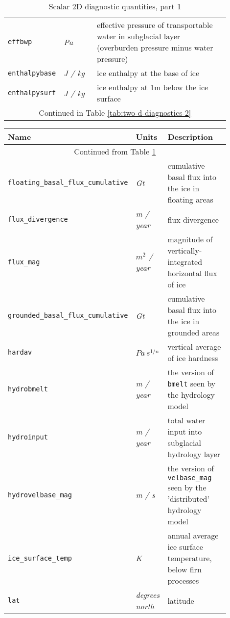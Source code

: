 \begin{table}[ht]
\begin{tabular}{p{0.15\linewidth}p{0.15\linewidth}p{0.6\linewidth}}
    \texttt{effbwp} & \textsl{Pa} & effective pressure of transportable water in subglacial layer (overburden pressure minus water pressure)\\
    \texttt{enthalpybase} & \textsl{J  / kg} &  ice enthalpy at the base of ice \\
    \texttt{enthalpysurf} & \textsl{J  / kg} &  ice enthalpy at 1m below the ice surface \\
   \multicolumn{3}{c}{Continued in Table \ref{tab:two-d-diagnostics-2}}\\
  \bottomrule
  \end{tabular}
  \caption{Scalar 2D diagnostic quantities, part 1}
  \label{tab:two-d-diagnostics-1}
\end{table}

\begin{table}[ht]
  \centering
  \begin{tabular}{p{0.15\linewidth}p{0.15\linewidth}p{0.6\linewidth}}
    \toprule
    \textbf{Name} & \textbf{Units} & \textbf{Description} \\
    \midrule
    \multicolumn{3}{c}{Continued from Table \ref{tab:two-d-diagnostics-1}}\\
    \texttt{floating_basal_flux_cumulative} & \textsl{Gt} & cumulative basal flux into the ice in floating areas \\
    \texttt{flux_divergence} & \textsl{m / year} &  flux divergence \\
    \texttt{flux_mag} & \textsl{$m^{2}$ / year} &  magnitude of vertically-integrated horizontal flux of ice \\
    \texttt{grounded_basal_flux_cumulative} & \textsl{Gt} & cumulative basal flux into the ice in grounded areas \\
    \texttt{hardav} & $Pa\, s^{1/n}$ &  vertical average of ice hardness \\
    \texttt{hydrobmelt} & \textsl{m / year} & the version of \texttt{bmelt} seen by the hydrology model\\
    \texttt{hydroinput} & \textsl{m / year} & total water input into subglacial hydrology layer\\
    \texttt{hydrovelbase_mag} & \textsl{m / s} & the version of \texttt{velbase_mag} seen by the 'distributed' hydrology model\\
    \texttt{ice_surface_temp} & \textsl{K} & annual average ice surface temperature, below firn processes \\
    \texttt{lat} & \textsl{degrees north} & latitude \\

\end{tabular}
\end{table}
